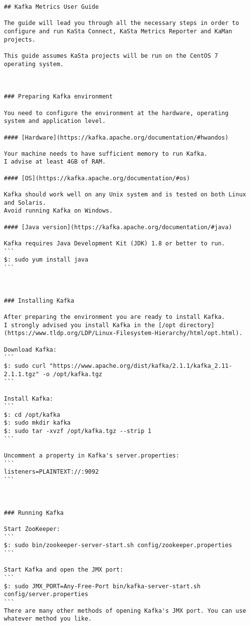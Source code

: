 \documentclass[times, utf8, diplomski, numeric]{fer}
\begin{document}
\begin{lstlisting}[breaklines]
## Kafka Metrics User Guide

The guide will lead you through all the necessary steps in order to configure and run KaSta Connect, KaSta Metrics Reporter and KaMan projects.  

This guide assumes KaSta projects will be run on the CentOS 7 operating system.



### Preparing Kafka environment

You need to configure the environment at the hardware, operating system and application level.  

#### [Hardware](https://kafka.apache.org/documentation/#hwandos)

Your machine needs to have sufficient memory to run Kafka.  
I advise at least 4GB of RAM.  

#### [OS](https://kafka.apache.org/documentation/#os)

Kafka should work well on any Unix system and is tested on both Linux and Solaris.  
Avoid running Kafka on Windows.  

#### [Java version](https://kafka.apache.org/documentation/#java)

Kafka requires Java Development Kit (JDK) 1.8 or better to run.  
```
$: sudo yum install java
```



### Installing Kafka

After preparing the environment you are ready to install Kafka.  
I strongly advised you install Kafka in the [/opt directory](https://www.tldp.org/LDP/Linux-Filesystem-Hierarchy/html/opt.html).  

Download Kafka:  
```
$: sudo curl "https://www.apache.org/dist/kafka/2.1.1/kafka_2.11-2.1.1.tgz" -o /opt/kafka.tgz
```

Install Kafka:  
```
$: cd /opt/kafka
$: sudo mkdir kafka
$: sudo tar -xvzf /opt/kafka.tgz --strip 1
```

Uncomment a property in Kafka's server.properties:  
```
listeners=PLAINTEXT://:9092
```



### Running Kafka

Start ZooKeeper:  
```
$: sudo bin/zookeeper-server-start.sh config/zookeeper.properties
```

Start Kafka and open the JMX port:  
```
$: sudo JMX_PORT=Any-Free-Port bin/kafka-server-start.sh config/server.properties
```
There are many other methods of opening Kafka's JMX port. You can use whatever method you like.  


\end{lstlisting}
\end{document}
